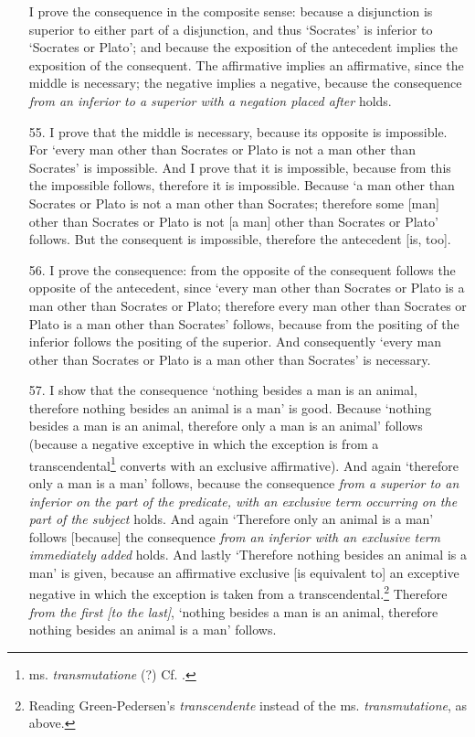 \begin{enumerate}
I prove the consequence in the composite sense: because a disjunction is superior to either part of a disjunction, and thus `Socrates' is inferior to `Socrates or Plato'; and because the exposition of the antecedent implies the exposition of the consequent. The affirmative implies an affirmative, since the middle is necessary; the negative implies a negative, because the consequence \textit{from an inferior to a superior with a negation placed after} holds.
\item[55.] I prove that the middle is necessary, because its opposite is impossible. For `every man other than Socrates or Plato is not a man other than Socrates' is impossible. And I prove that it is impossible, because from this the impossible follows, therefore it is impossible. Because `a man other than Socrates or Plato is not a man other than Socrates; therefore some [man] other than Socrates or Plato is not [a man] other than Socrates or Plato' follows. But the consequent is impossible, therefore the antecedent [is, too].
\item[56.] I prove the consequence: from the opposite of the consequent follows the opposite of the antecedent, since `every man other than Socrates or Plato is a man other than Socrates or Plato; therefore every man other than Socrates or Plato is a man other than Socrates' follows, because from the positing of the inferior follows the positing of the superior. And consequently `every man other than Socrates or Plato is a man other than Socrates' is necessary.
\item[57.] I show that the consequence `nothing besides a man is an animal, therefore nothing besides an animal is a man' is good. Because `nothing besides a man is an animal, therefore only a man is an animal' follows (because a negative exceptive in which the exception is from a transcendental\footnote{ms. \textit{transmutatione} (?) Cf. \cite[pp. 124-125, par. 158]{Green-Pedersen1980b}.} converts with an exclusive affirmative). And again `therefore only a man is a man' follows, because the consequence \textit{from a superior to an inferior on the part of the predicate, with an exclusive term occurring on the part of the subject} holds. And again `Therefore only an animal is a man' follows [because] the consequence \textit{from an inferior with an exclusive term immediately added} holds. And lastly `Therefore nothing besides an animal is a man' is given, because an affirmative exclusive [is equivalent to] an exceptive negative in which the exception is taken from a transcendental.\footnote{Reading Green-Pedersen's \textit{transcendente} instead of the ms. \textit{transmutatione}, as above.} Therefore \textit{from the first [to the last]}, `nothing besides a man is an animal, therefore nothing besides an animal is a man' follows.

\end{enumerate}
